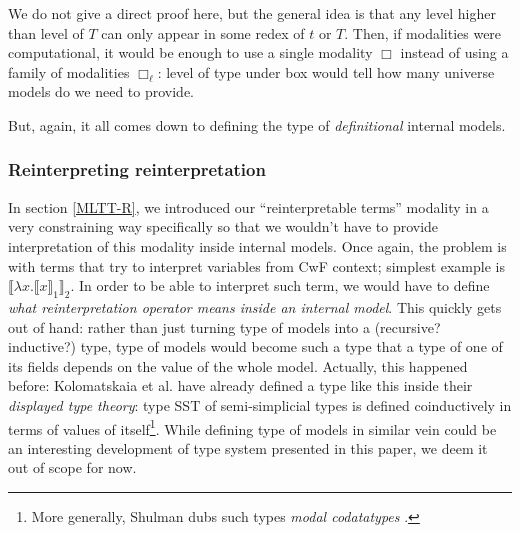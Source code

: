 We do not give a direct proof here, but the general idea
is that any level higher than level of $T$ can only
appear in some redex of $t$ or $T$. Then, if modalities
were computational, it would be enough to use a single
modality $\Box$ instead of using a family of modalities
$\Box_\ell$: level of type under box would tell how many
universe models do we need to provide.

But, again, it all comes down to defining the type of
\textit{definitional} internal models.

\subsubsection{Reinterpreting reinterpretation}

In section \ref{MLTT-R}, we introduced our
``reinterpretable terms'' modality in a very
constraining way specifically so that we wouldn't have
to provide interpretation of this modality inside
internal models. Once again, the problem is with terms
that try to interpret variables from CwF context;
simplest example is $\llbracket \lambda x.\llbracket x
\rrbracket_1\rrbracket_2$. In order to be able to
interpret such term, we would have to define \textit{
what reinterpretation operator means inside an internal
model}. This quickly gets out of hand: rather than just
turning type of models into a (recursive? inductive?)
type, type of models would become such a type that a
type of one of its fields depends on the value of the
whole model. Actually, this happened before:
Kolomatskaia et al. \cite{Kolomatskaia_Shulman_2025}
have already defined a type like this inside their
\textit{displayed type theory}: type SST of
semi-simplicial types is defined coinductively in terms
of values of itself\footnote{More generally, Shulman
dubs such types \textit{modal codatatypes}
\cite{shulman2026}.}. While defining type of models in
similar vein could be an interesting development of type
system presented in this paper, we deem it out of scope
for now.

